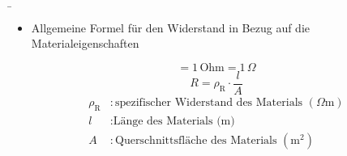 \begin{frame}
	\b{
	
		\begin{itemize}
			\item Allgemeine Formel für den Widerstand in Bezug auf die Materialeigenschaften
		\end{itemize}
		\vspace{1cm}
		\begin{equation*}
			[R] = 1\, \text{Ohm} = 1\, \text{$\Omega$}
		\end{equation*}
		\vspace{0.1cm}
		\begin{equation*}
			R = \rho_\mathrm{R} \cdot \frac{l}{A}
		\end{equation*}
		\begin{align*}
			\rho_\mathrm{R} & : \text{spezifischer Widerstand des Materials } (\Omega \text{m}) \\
			l               & : \text{Länge des Materials (m)}                                  \\
			A               & : \text{Querschnittsfläche des Materials } (\text{m}^2)           \\
		\end{align*}
		
}
\end{frame}
